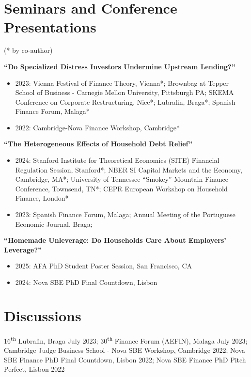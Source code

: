\documentclass[letterpaper]{article}
\newenvironment{itemize*}{
  \begin{list}{}{
    \setlength{\leftmargin}{1.5em}
  }
}{
  \end{list}
}
\begin{document}
\section*{Seminars and Conference Presentations}
\vspace{-0.1in}
(* by co-author)
\begin{itemize*}
\item \textbf{``Do Specialized Distress Investors Undermine Upstream Lending?''}
\begin{itemize}
\item 2023: Vienna Festival of Finance Theory, Vienna*; Brownbag at Tepper School of Business - Carnegie Mellon University, Pittsburgh PA; SKEMA Conference on Corporate Restructuring, Nice*; Lubrafin, Braga*; Spanish Finance Forum, Malaga*
\item 2022: Cambridge-Nova Finance Workshop, Cambridge*
\end{itemize}
\item \textbf{``The Heterogeneous Effects of Household Debt Relief''}
\begin{itemize}
\item 2024: Stanford Institute for Theoretical Economics (SITE) Financial Regulation Session, Stanford*; NBER SI Capital Markets and the Economy, Cambridge, MA*; University of Tennessee ``Smokey'' Mountain Finance Conference, Townsend, TN*; CEPR European Workshop on Household Finance, London*
\item 2023: Spanish Finance Forum, Malaga; Annual Meeting of the Portuguese Economic Journal, Braga; 
\end{itemize}
\item \textbf{``Homemade Unleverage: Do Households Care About Employers' Leverage?''}
\begin{itemize}
\item 2025: AFA PhD Student Poster Session, San Francisco, CA
\item 2024: Nova SBE PhD Final Countdown, Lisbon
\end{itemize}
\end{itemize*}

\section*{Discussions}
\begin{itemize*}
\item 16\textsuperscript{th}  Lubrafin, Braga July 2023; 30\textsuperscript{th} Finance Forum (AEFIN), Malaga July 2023; Cambridge Judge Business School - Nova SBE Workshop,  Cambridge 2022; Nova SBE Finance PhD Final Countdown, Lisbon 2022; Nova SBE Finance PhD Pitch Perfect, Lisbon 2022
\end{itemize*}
\end{document}
